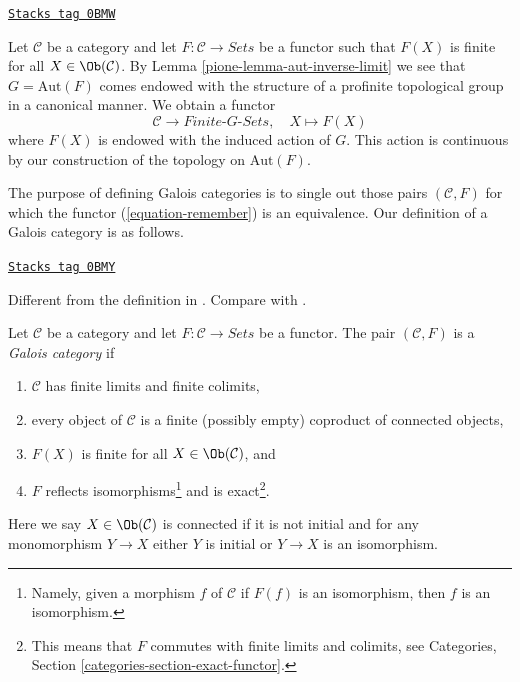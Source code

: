\begin{example}
\label{pione-example-from-C-F-to-G-sets}
\href{https://stacks.math.columbia.edu/tag/0BMW}{\texttt{Stacks tag 0BMW}}

Let $\mathcal{C}$ be a category and let $F : \mathcal{C} \to \textit{Sets}$
be a functor such that $F(X)$ is finite for all $X \in \Ob(\mathcal{C})$.
By Lemma \ref{pione-lemma-aut-inverse-limit} we see that $G = \text{Aut}(F)$
comes endowed with the structure of a profinite topological group in a
canonical manner. We obtain a functor
\begin{equation}
\label{equation-remember}
\mathcal{C} \longrightarrow \textit{Finite-}G\textit{-Sets},\quad
X \longmapsto F(X)
\end{equation}
where $F(X)$ is endowed with the induced action of $G$. This action
is continuous by our construction of the topology on $\text{Aut}(F)$.
\end{example}

The purpose of defining Galois categories is to single out those
pairs $(\mathcal{C}, F)$ for which the functor (\ref{equation-remember})
is an equivalence. Our definition of a Galois category is as follows.

\begin{definition}
\label{pione-definition-galois-category}
\href{https://stacks.math.columbia.edu/tag/0BMY}{\texttt{Stacks tag 0BMY}}

\begin{reference}
Different from the definition in \cite[Expos\'e V, Definition 5.1]{SGA1}.
Compare with \cite[Definition 7.2.1]{BS}.
\end{reference}
Let $\mathcal{C}$ be a category and let $F : \mathcal{C} \to \textit{Sets}$
be a functor. The pair $(\mathcal{C}, F)$ is a {\it Galois category} if
\begin{enumerate}
\item $\mathcal{C}$ has finite limits and finite colimits,
\item
\label{pione-item-connected-components}
every object of $\mathcal{C}$ is a finite (possibly empty)
coproduct of connected objects,
\item $F(X)$ is finite for all $X \in \Ob(\mathcal{C})$, and
\item $F$ reflects isomorphisms\footnote{Namely, given a morphism
$f$ of $\mathcal{C}$ if $F(f)$ is an isomorphism, then
$f$ is an isomorphism.} and is exact\footnote{This means that
$F$ commutes with finite limits and colimits, see
Categories, Section \ref{categories-section-exact-functor}.}.
\end{enumerate}
Here we say $X \in \Ob(\mathcal{C})$ is connected if
it is not initial and for any monomorphism $Y \to X$
either $Y$ is initial or $Y \to X$ is an isomorphism.
\end{definition}

